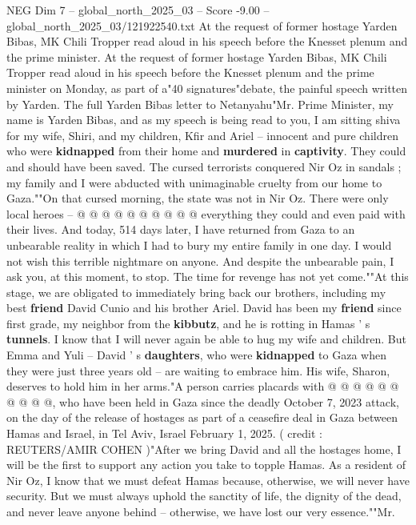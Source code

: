 \begin{textsample}{NEG Dim 7 – global\_north\_2025\_03 – Score -9.00 – global\_north\_2025\_03/121922540.txt}  \label{ex:f7_neg_122}
At the request of former hostage Yarden Bibas, MK Chili Tropper read aloud in his speech before the Knesset plenum and the prime minister.
At the request of former hostage Yarden Bibas, MK Chili Tropper read aloud in his speech before the Knesset plenum and the prime minister on Monday, as part of a"40 signatures"debate, the painful speech written by Yarden.
The full Yarden Bibas letter to Netanyahu"Mr.
Prime Minister, my name is Yarden Bibas, and as my speech is being read to you, I am sitting shiva for my wife, Shiri, and my children, Kfir and Ariel -- innocent and pure children who were \textbf{kidnapped} from their home and \textbf{murdered} in \textbf{captivity}.
They could and should have been saved.
The cursed terrorists conquered Nir Oz in sandals ; my family and I were abducted with unimaginable cruelty from our home to Gaza.""On that cursed morning, the state was not in Nir Oz.
There were only local heroes -- @ @ @ @ @ @ @ @ @ @ everything they could and even paid with their lives.
And today, 514 days later, I have returned from Gaza to an unbearable reality in which I had to bury my entire family in one day.
I would not wish this terrible nightmare on anyone.
And despite the unbearable pain, I ask you, at this moment, to stop.
The time for revenge has not yet come.""At this stage, we are obligated to immediately bring back our brothers, including my best \textbf{friend} David Cunio and his brother Ariel.
David has been my \textbf{friend} since first grade, my neighbor from the \textbf{kibbutz}, and he is rotting in Hamas ' s \textbf{tunnels}.
I know that I will never again be able to hug my wife and children.
But Emma and Yuli -- David ' s \textbf{daughters}, who were \textbf{kidnapped} to Gaza when they were just three years old -- are waiting to embrace him.
His wife, Sharon, deserves to hold him in her arms."A person carries placards with @ @ @ @ @ @ @ @ @ @, who have been held in Gaza since the deadly October 7, 2023 attack, on the day of the release of hostages as part of a ceasefire deal in Gaza between Hamas and Israel, in Tel Aviv, Israel February 1, 2025. ( credit : REUTERS/AMIR COHEN )"After we bring David and all the hostages home, I will be the first to support any action you take to topple Hamas.
As a resident of Nir Oz, I know that we must defeat Hamas because, otherwise, we will never have security.
But we must always uphold the sanctity of life, the dignity of the dead, and never leave anyone behind -- otherwise, we have lost our very essence.""Mr.

\end{textsample}
